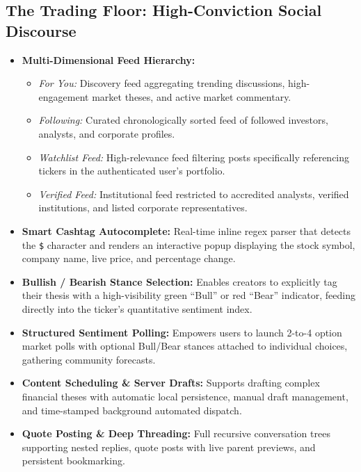 \documentclass[11pt,a4paper]{article}
\begin{document}
\subsection{The Trading Floor: High-Conviction Social Discourse}
\begin{itemize}
    \item \textbf{Multi-Dimensional Feed Hierarchy:}
    \begin{itemize}
        \item \textit{For You:} Discovery feed aggregating trending discussions, high-engagement market theses, and active market commentary.
        \item \textit{Following:} Curated chronologically sorted feed of followed investors, analysts, and corporate profiles.
        \item \textit{Watchlist Feed:} High-relevance feed filtering posts specifically referencing tickers in the authenticated user's portfolio.
        \item \textit{Verified Feed:} Institutional feed restricted to accredited analysts, verified institutions, and listed corporate representatives.
    \end{itemize}
    \item \textbf{Smart Cashtag Autocomplete:} Real-time inline regex parser that detects the \texttt{\$} character and renders an interactive popup displaying the stock symbol, company name, live price, and percentage change.
    \item \textbf{Bullish / Bearish Stance Selection:} Enables creators to explicitly tag their thesis with a high-visibility green ``Bull'' or red ``Bear'' indicator, feeding directly into the ticker's quantitative sentiment index.
    \item \textbf{Structured Sentiment Polling:} Empowers users to launch 2-to-4 option market polls with optional Bull/Bear stances attached to individual choices, gathering community forecasts.
    \item \textbf{Content Scheduling \& Server Drafts:} Supports drafting complex financial theses with automatic local persistence, manual draft management, and time-stamped background automated dispatch.
    \item \textbf{Quote Posting \& Deep Threading:} Full recursive conversation trees supporting nested replies, quote posts with live parent previews, and persistent bookmarking.
\end{itemize}
\end{document}

